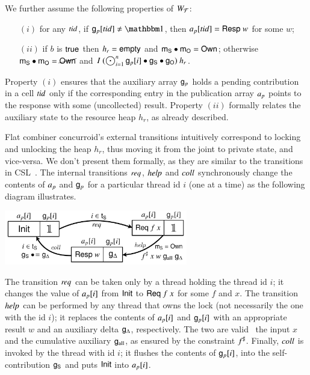 We further assume the following properties of $W_{\mathcal{F}}$:
%
\begin{itemize}
\item [$(i)$] for any $\mathit{tid}$, if $\gp[\tid] \neq \pcmU$, then $\text{\emph{a}}_p[\mathit{tid}] =
  \mathsf{Resp}\ {w}$ for some $w$;
\item [$(ii)$] if $b$ is $\mathsf{true}$ then $h_r = \mathsf{empty}$ and $\mathsf{m}_{{\mathsf{S}}} \bullet
  \mathsf{m}_{{\mathsf{O}}} = \mathsf{Own}$; otherwise $\mathsf{m}_{{\mathsf{S}}} \bullet \mathsf{m}_{{\mathsf{O}}} = \cancel{\mathsf{Own}}$ and
  $I~(\bigodot_{i=1}^n\mathsf{g}_{p}[i] \bullet \mathsf{g}_{{\mathsf{S}}} \bullet \mathsf{g}_{{\mathsf{O}}} )~h_r$.
\end{itemize}
%
Property $(i)$ ensures that the auxiliary array $\mathsf{g}_{p}$ holds a pending
contribution in a cell $\mathit{tid}$ only if the corresponding entry in the
publication array $\text{\emph{a}}_p$ points to the response with some (uncollected)
result.
%
Property $(ii)$ formally relates the auxiliary state to the resource
heap $h_r$, as already described.

Flat combiner concurroid's external transitions intuitively correspond
to locking and unlocking the heap $h_r$, thus moving it from the joint
to private state, and vice-versa. We don't present them formally, as
they are similar to the transitions in CSL~\cite{Nanevski-al:ESOP14}.
%
The internal transitions $\text{\emph{req}}$, $\text{\emph{help}}$ and $\text{\emph{coll}}$
synchronously change the contents of $\text{\emph{a}}_p$ and $\mathsf{g}_{p}$ for a particular
thread id $i$ (one at a time) as the following diagram illustrates.
%
%
\begin{center}
\includegraphics[width=0.60\textwidth]{fctrans.pdf}    
\end{center}
%
%
The transition $\text{\emph{req}}$ can be taken only by a thread holding the
thread id $i$; it changes the value of $\text{\emph{a}}_p[i]$ from $\mathsf{Init}$ to
$\mathsf{Req}\ {f}~{x}$ for some $f$ and $x$.
%
The transition $\text{\emph{help}}$ can be performed by any thread that owns
the lock (not necessarily the one with the id $i$); it replaces the
contents of $\text{\emph{a}}_p[i]$ and $\mathsf{g}_{p}[i]$ with an appropriate result $w$ and
an auxiliary delta $\mathsf{g}_{\Delta}$, respectively. The two are valid \wrt~the
input $x$ and the cumulative auxiliary $\mathsf{g}_{\text{all}}$, as ensured by the
constraint ${f}^{\sharp}$.
%
Finally, $\text{\emph{coll}}$ is invoked by the thread with id $i$; it flushes
the contents of $\mathsf{g}_{p}[i]$, into the self-contribution $\mathsf{g}_{\mathsf{S}}$ and puts
$\mathsf{Init}$ into $\text{\emph{a}}_p[i]$.

